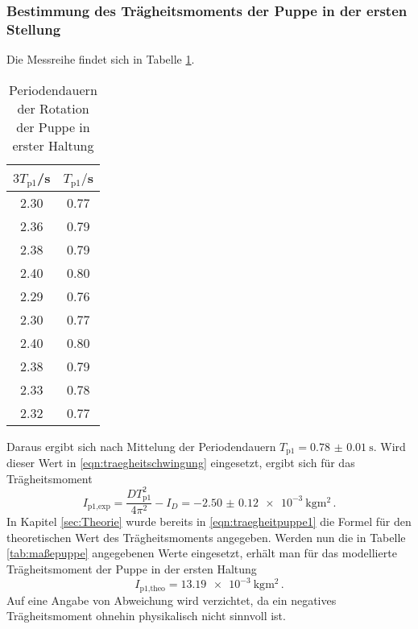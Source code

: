 \subsubsection{Bestimmung des Trägheitsmoments der Puppe in der ersten Stellung}
Die Messreihe findet sich in Tabelle \ref{tab:puppe1}.
\begin{table}
\centering
\caption{Periodendauern der Rotation der Puppe in erster Haltung}
\label{tab:puppe1}
\begin{tabular}{c c}
\toprule
$3T_{\text{p1}}$/s & $T_{\text{p1}}/$s \\
\midrule
2.30 & 0.77 \\
2.36 & 0.79 \\
2.38 & 0.79 \\
2.40 & 0.80 \\
2.29 & 0.76 \\
2.30 & 0.77 \\
2.40 & 0.80 \\
2.38 & 0.79 \\
2.33 & 0.78 \\
2.32 & 0.77 \\
\bottomrule
\end{tabular}
\end{table}

Daraus ergibt sich nach Mittelung der Periodendauern
$T_{\text{p1}}=\SI{0.78(001)}{\second}$. Wird dieser Wert in
\eqref{eqn:traegheitschwingung} eingesetzt, ergibt sich für das Trägheitsmoment
\begin{equation}
  I_{\text{p1,exp}} = \frac{DT_{\text{p1}}^2}{4\pi^2}-I_D = \SI{-2.50(012)e-3}{\kilogram\meter\squared}\,.
\end{equation}
In Kapitel \ref{sec:Theorie} wurde bereits in \eqref{eqn:traegheitpuppe1} die
Formel für den theoretischen Wert des Trägheitsmoments angegeben. Werden nun die
in Tabelle \ref{tab:maßepuppe} angegebenen Werte eingesetzt, erhält man für das
modellierte Trägheitsmoment der Puppe in der ersten Haltung
\begin{equation}
  I_{\text{p1,theo}} = \SI{13.19e-3}{\kilogram\meter\squared}\,.
\end{equation}
Auf eine Angabe von Abweichung wird verzichtet, da ein negatives Trägheitsmoment
ohnehin physikalisch nicht sinnvoll ist.
